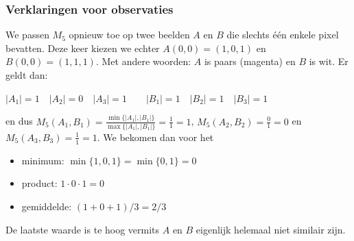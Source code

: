 \documentclass[dutch]{beamer}
\theoremstyle{definition}
\theoremstyle{remark}
\theoremstyle{example}
\begin{document}
\frame
{
  \frametitle{Verklaringen voor observaties}
  
  We passen $M_5$ opnieuw toe op twee beelden $A$ en $B$ die slechts \'e\'en enkele pixel 
  bevatten. Deze keer kiezen we echter $A(0,0)=(1,0,1)$ en $B(0,0)=(1,1,1)$. Met 
  andere woorden: $A$ is {\color{mymagenta} paars (magenta)} en $B$ is {\color{white} wit}. Er geldt dan:
  \begin{minipage}{\textwidth}
  \vspace{4pt}
  \small
  \centering
  $|A_1|=1 \quad |A_2|=0 \quad |A_3|=1 \qquad |B_1|=1 \quad |B_2|=1 \quad |B_3|=1$
  \vspace{4pt}
  \end{minipage}
  en dus
  $M_5(A_1,B_1)=\frac{\min\{|A_1|,|B_1|\}}{\max\{|A_1|,|B_1|\}}=\frac{1}{1}=1$, 
  $M_5(A_2,B_2)=\frac{0}{1}=0$ {\normalsize en} $M_5(A_3,B_3)=\frac{1}{1}=1$.
  We bekomen dan voor het
  \begin{itemize}
    \item minimum: $\min\{1,0,1\}=\min\{0,1\}=0$
    \item product: $1 \cdot 0 \cdot 1 = 0$
    \item gemiddelde: $(1+0+1)/3=2/3$
  \end{itemize}
  De laatste waarde is te hoog vermits $A$ en $B$ eigenlijk helemaal niet 
  similair zijn.
}
\end{document}

